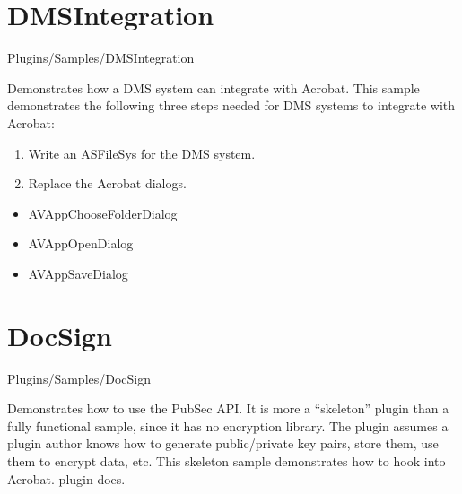 \documentclass[letterpaper,12pt,english,openany,oneside]{sphinxmanual}
\begin{document}
\section{DMSIntegration}
\label{\detokenize{Samples_Plug_in:dmsintegration}}\label{\detokenize{Samples_Plug_in:location-4}}

Plugins/Samples/DMSIntegration

\label{\detokenize{Samples_Plug_in:description-4}}

Demonstrates how a DMS system can integrate with Acrobat. This sample demonstrates the following three steps needed for DMS systems to integrate with Acrobat:
\begin{enumerate}
%
\item {} 
Write an ASFileSys for the DMS system.

\item {} 
Replace the Acrobat dialogs.

\end{enumerate}
\begin{itemize}
\item {} 
AVAppChooseFolderDialog

\item {} 
AVAppOpenDialog

\item {} 
AVAppSaveDialog

\end{itemize}


\section{DocSign}
\label{\detokenize{Samples_Plug_in:docsign}}\label{\detokenize{Samples_Plug_in:location-5}}

Plugins/Samples/DocSign

\label{\detokenize{Samples_Plug_in:description-5}}

Demonstrates how to use the PubSec API. It is more a “skeleton” plugin than a fully functional sample, since it has no encryption library. The plugin assumes a plugin author knows how to generate public/private key pairs, store them, use them to encrypt data, etc. This skeleton sample demonstrates how to hook into Acrobat. plugin does.

\label{\detokenize{Samples_Plug_in:usage-3}}
\end{document}
